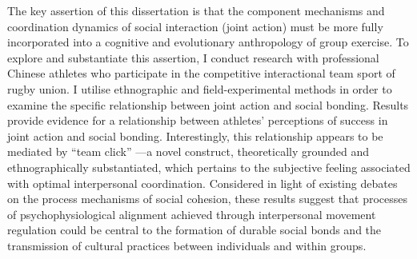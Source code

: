 The key assertion of this dissertation is that the component mechanisms and coordination dynamics of social interaction (joint action) must be more fully incorporated into a cognitive and evolutionary anthropology of group exercise. To explore and substantiate this assertion, I conduct research with professional Chinese athletes who participate in the competitive interactional team sport of rugby union.  I utilise ethnographic and field-experimental methods in order to examine the specific relationship between joint action and social bonding.  Results provide evidence for a relationship between athletes' perceptions of success in joint action and social bonding.  Interestingly, this relationship appears to be mediated by ``team click'' ---a novel construct, theoretically grounded and ethnographically substantiated, which pertains to the subjective feeling associated with optimal interpersonal coordination.  Considered in light of existing debates on the process mechanisms of social cohesion, these results suggest that processes of psychophysiological alignment achieved through interpersonal movement regulation could be central to the formation of durable social bonds and the transmission of cultural practices between individuals and within groups.

